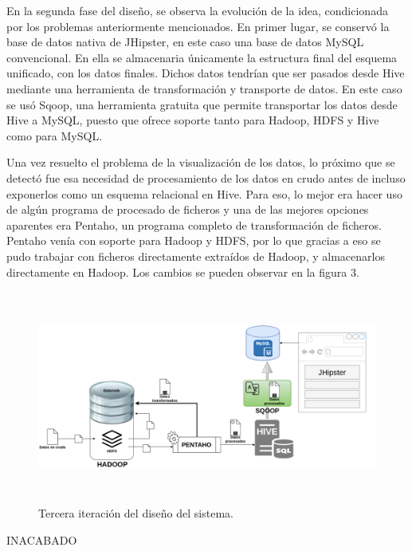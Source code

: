 En la segunda fase del diseño, se observa la evolución de la idea, condicionada por los problemas anteriormente mencionados. En primer lugar, se conservó la base de datos nativa de JHipster, en este caso una base de datos MySQL convencional. En ella se almacenaria únicamente la estructura final del esquema unificado, con los datos finales. Dichos datos tendrían que ser pasados desde Hive mediante una herramienta de transformación y transporte de datos. En este caso se usó Sqoop, una herramienta gratuita que permite transportar los datos desde Hive a MySQL, puesto que ofrece soporte tanto para Hadoop, HDFS y Hive como para MySQL. \par
Una vez resuelto el problema de la visualización de los datos, lo próximo que se detectó fue esa necesidad de procesamiento de los datos en crudo antes de incluso exponerlos como un esquema relacional en Hive. Para eso, lo mejor era hacer uso de algún programa de procesado de ficheros y una de las mejores opciones aparentes era Pentaho, un programa completo de transformación de ficheros. Pentaho venía con soporte para Hadoop y HDFS, por lo que gracias a eso se pudo trabajar con ficheros directamente extraídos de Hadoop, y almacenarlos directamente en Hadoop. Los cambios se pueden observar en la figura 3. \par


\begin{figure}[H]
    \centering
    \includegraphics[width=1\textwidth,height=7cm]{Imagenes/Dis_Fig_3}
    \caption{Tercera iteración del diseño del sistema.}
    \label{fig:dis_2_sist}
\end{figure}
\par


INACABADO

